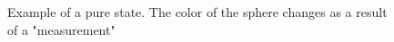 \begin{figure}
\centering



\caption{Example of a pure state. The color of the sphere changes as a result of a "measurement"}
\label{figAddPureStateExample}
\end{figure}